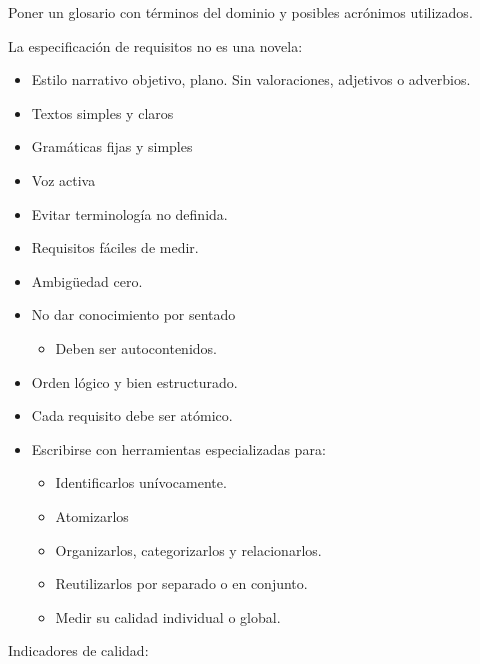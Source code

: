 \documentclass[12pt, twoside, openright]{report} %
\begin{document}
	Poner un glosario con términos del dominio y posibles acrónimos
    utilizados.

	La especificación de requisitos no es una novela:

    \begin{itemize}
    
    \item
      Estilo narrativo objetivo, plano. Sin valoraciones, adjetivos o
      adverbios.
    \item
      Textos simples y claros
    \item
      Gramáticas fijas y simples
    \item
      Voz activa
    \item
      Evitar terminología no definida.
    \item
      Requisitos fáciles de medir.
    \item
      Ambigüedad cero.
    \item
      No dar conocimiento por sentado

      \begin{itemize}
      
      \item
        Deben ser autocontenidos.
      \end{itemize}
    \item
      Orden lógico y bien estructurado.
    \item
      Cada requisito debe ser atómico.
    \item
      Escribirse con herramientas especializadas para:

      \begin{itemize}
      
      \item
        Identificarlos unívocamente.
      \item
        Atomizarlos
      \item
        Organizarlos, categorizarlos y relacionarlos.
      \item
        Reutilizarlos por separado o en conjunto.
      \item
        Medir su calidad individual o global.
      \end{itemize}
    \end{itemize}
\pagebreak
	Indicadores de calidad:
\end{document}
